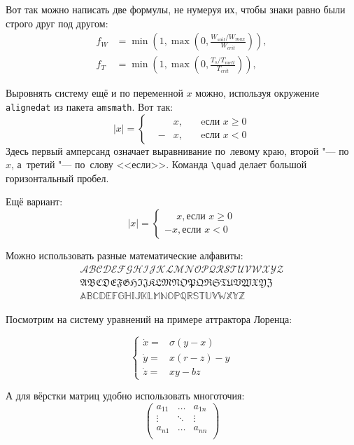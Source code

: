 Вот так можно написать две формулы, не нумеруя их, чтобы знаки равно были строго друг под другом:
\begin{align}
  f_W & =  \min \left( 1, \max \left( 0, \frac{W_{soil} / W_{max}}{W_{crit}} \right)  \right), \nonumber \\
  f_T & =  \min \left( 1, \max \left( 0, \frac{T_s / T_{melt}}{T_{crit}} \right)  \right), \nonumber
\end{align}

Выровнять систему ещё и по переменной $ x $ можно, используя окружение \verb|alignedat| из пакета \verb|amsmath|. Вот так: 
\[
    |x| = \left\{
    \begin{alignedat}{2}
        &&x, \quad &\text{eсли } x\geqslant 0 \\
        &-&x, \quad & \text{eсли } x<0
    \end{alignedat}
    \right.
\]
Здесь первый амперсанд  означает выравнивание по~левому краю, второй "--- по~$ x $, а~третий "--- по~слову <<если>>. Команда \verb|\quad| делает большой горизонтальный пробел. 

Ещё вариант:
\[
    |x|=
    \begin{cases}
    \phantom{-}x, \text{если } x \geqslant 0 \\
    -x, \text{если } x<0
    \end{cases}
\]

Можно использовать разные математические алфавиты:
\begin{align}
\mathcal{ABCDEFGHIJKLMNOPQRSTUVWXYZ} \nonumber \\
\mathfrak{ABCDEFGHIJKLMNOPQRSTUVWXYZ} \nonumber \\
\mathbb{ABCDEFGHIJKLMNOPQRSTUVWXYZ} \nonumber
\end{align}

Посмотрим на систему уравнений на примере аттрактора Лоренца:

\[ 
\left\{
  \begin{array}{rl}
    \dot x = & \sigma (y-x) \\
    \dot y = & x (r - z) - y \\
    \dot z = & xy - bz
  \end{array}
\right.
\]

А для вёрстки матриц удобно использовать многоточия:
\[ 
\left(
  \begin{array}{ccc}
  	a_{11} & \ldots & a_{1n} \\
  	\vdots & \ddots & \vdots \\
  	a_{n1} & \ldots & a_{nn} \\
  \end{array}
\right)
\]


